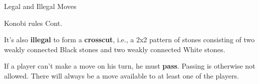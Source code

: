 \documentclass{beamer}
\begin{document}
  \begin{frame}{Legal and Illegal Moves}


    \begin{figure}
      \centering
    \end{figure}

  \end{frame}



  \begin{frame}{Konobi rules Cont.}

    It's also \textbf{illegal} to form a \textbf{crosscut}, i.e., a 2x2 pattern of stones consisting of two weakly connected Black stones and two weakly connected White stones.

    \vspace{1em}

    \begin{figure}
    \end{figure}


    If a player can't make a move on his turn, he must \textbf{pass}. Passing is otherwise not allowed. There will always be a move available to at least one of the players.

  \end{frame}
\end{document}
